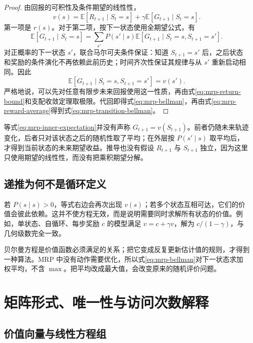 \documentclass[UTF8,12pt,a4paper,fontset=fandol]{ctexart}
\begin{document}
\begin{proof}
由回报的可积性及条件期望的线性性，
\[
  v(s)=\mathbb E[R_{t+1}\mid S_t=s]
      +\gamma\mathbb E[G_{t+1}\mid S_t=s].
\]
第一项是 $r(s)$。对于第二项，按下一状态使用全期望公式，有
\[
  \mathbb E[G_{t+1}\mid S_t=s]
  =\sum_{s'}P(s'\mid s)
     \mathbb E[G_{t+1}\mid S_t=s,S_{t+1}=s'].
\]
对正概率的下一状态 $s'$，联合马尔可夫条件保证：知道 $S_{t+1}=s'$ 后，之后状态和奖励的条件演化不再依赖此前历史；时间齐次性保证其规律与从 $s'$ 重新启动相同。因此
\begin{equation}
  \mathbb E[G_{t+1}\mid S_t=s,S_{t+1}=s']=v(s').
  \label{eq:mrp-inner-expectation}
\end{equation}
严格地说，可以先对任意有限步未来回报使用这一性质，再由式\eqref{eq:mrp-return-bound}和支配收敛定理取极限。代回即得式\eqref{eq:mrp-bellman}，再由式\eqref{eq:mrp-reward-average}得到式\eqref{eq:mrp-transition-bellman}。
\end{proof}

等式\eqref{eq:mrp-inner-expectation}并没有声称 $G_{t+1}=v(S_{t+1})$。前者仍随未来轨迹变化，后者只对该状态之后的随机性取了平均；在外层按 $P(s'\mid s)$ 取平均后，才得到当前状态的未来期望收益。推导也没有假设 $R_{t+1}$ 与 $S_{t+1}$ 独立，因为这里只使用期望的线性性，而没有把乘积期望分解。

\subsection{递推为何不是循环定义}

若 $P(s\mid s)>0$，等式右边会再次出现 $v(s)$；若多个状态互相可达，它们的价值会彼此依赖。这并不使方程无效，而是说明需要同时求解所有状态的价值。例如，单状态、自循环、每步奖励 $c$ 的模型满足 $v=c+\gamma v$，解为 $c/(1-\gamma)$，与几何级数完全一致。

贝尔曼方程是价值函数必须满足的关系；把它变成反复更新估计值的规则，才得到一种算法。MRP 中没有动作需要优化，所以式\eqref{eq:mrp-bellman}对下一状态求加权平均，不含 $\max$。把平均改成最大值，会改变原来的随机评价问题。

\section{矩阵形式、唯一性与访问次数解释}
\label{sec:mrp-matrix}

\subsection{价值向量与线性方程组}
\end{document}
